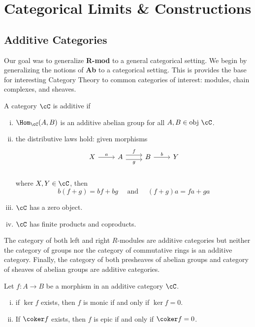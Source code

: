 \newpage
\section{Categorical Limits \& Constructions} 
\subsection{Additive Categories}


Our goal was to generalize \textbf{R-mod} to a general categorical setting. We begin by generalizing the notions of \textbf{Ab} to a categorical setting. This is provides the base for interesting Category Theory to common categories of interest: modules, chain complexes, and sheaves. 


\begin{dfn}
A category $\cC$ is additive if 
	\begin{enumerate}[(i)]
	\item $\Hom_{\cC}(A,B)$ is an additive abelian group for all $A,B \in \text{obj }\cC$.
	\item the distributive laws hold: given morphisms
		\[
		\begin{tikzcd}
		X \arrow{r}{a} & A \arrow[yshift=0.75ex]{r}{f} \arrow[yshift=-0.75ex,swap]{r}{g} & B \arrow{r}{b} & Y \\
		\end{tikzcd}
		\]
where $X,Y \in \cC$, then 
		\[
		b(f+g)=bf+bg \quad \text{ and } \quad (f+g)a=fa+ga
		\]
	\item $\cC$ has a zero object.
	\item $\cC$ has finite products and coproducts.
	\end{enumerate}
\end{dfn}


\begin{ex}
The category of both left and right $R$-modules are additive categories but neither the category of groups nor the category of commutative rings is an additive category. Finally, the category of both presheaves of abelian groups and category of sheaves of abelian groups are additive categories. \xqed 
\end{ex}


\begin{prop}
Let $f: A \to B$ be a morphism in an additive category $\cC$.
	\begin{enumerate}[(i)]
	\item if $\ker f$ exists, then $f$ is monic if and only if $\ker f=0$.
	\item If $\coker f$ exists, then $f$ is epic if and only if $\coker f=0$. 
	\end{enumerate}
\end{prop}

